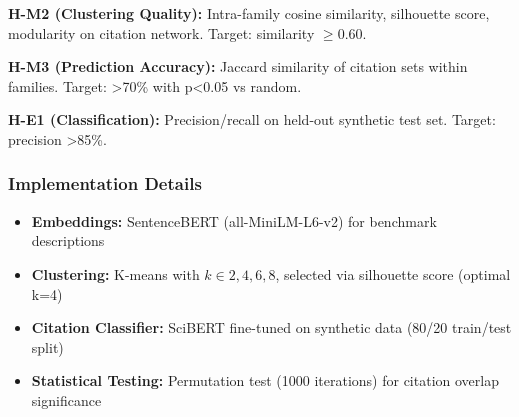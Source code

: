 \textbf{H-M2 (Clustering Quality):} Intra-family cosine similarity, silhouette score, modularity on citation network. Target: similarity $\geq 0.60$.

\textbf{H-M3 (Prediction Accuracy):} Jaccard similarity of citation sets within families. Target: >70\% with p<0.05 vs random.

\textbf{H-E1 (Classification):} Precision/recall on held-out synthetic test set. Target: precision >85\%.

\subsubsection{Implementation Details}

\begin{itemize}
\item \textbf{Embeddings:} SentenceBERT (all-MiniLM-L6-v2) for benchmark descriptions
\item \textbf{Clustering:} K-means with $k\in {2,4,6,8}$, selected via silhouette score (optimal k=4)
\item \textbf{Citation Classifier:} SciBERT fine-tuned on synthetic data (80/20 train/test split)
\item \textbf{Statistical Testing:} Permutation test (1000 iterations) for citation overlap significance
\end{itemize}
